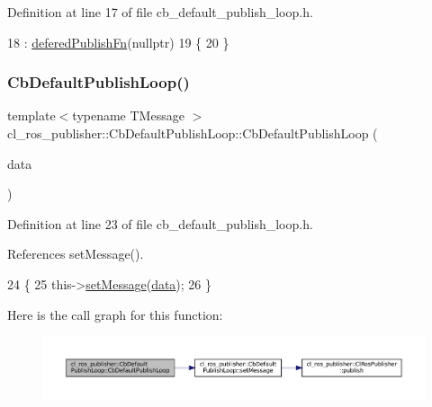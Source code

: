 Definition at line 17 of file cb\+\_\+default\+\_\+publish\+\_\+loop.\+h.


\begin{DoxyCode}
18         : \hyperlink{classcl__ros__publisher_1_1CbDefaultPublishLoop_ac0044704637edbd8f79a69d5b06de9ba}{deferedPublishFn}(\textcolor{keyword}{nullptr})
19     \{
20     \}
\end{DoxyCode}
\mbox{\label{classcl__ros__publisher_1_1CbDefaultPublishLoop_a41c35ec9ece9d457aa31efccfe4666c6}} 
\subsubsection{\texorpdfstring{Cb\+Default\+Publish\+Loop()}{CbDefaultPublishLoop()}\hspace{0.1cm}{\footnotesize\ttfamily [2/2]}}
{\footnotesize\ttfamily template$<$typename T\+Message $>$ \\
cl\+\_\+ros\+\_\+publisher\+::\+Cb\+Default\+Publish\+Loop\+::\+Cb\+Default\+Publish\+Loop (\begin{DoxyParamCaption}\item[{const T\+Message \&}]{data }\end{DoxyParamCaption})\hspace{0.3cm}{\ttfamily [inline]}}



Definition at line 23 of file cb\+\_\+default\+\_\+publish\+\_\+loop.\+h.



References set\+Message().


\begin{DoxyCode}
24     \{
25         this->\hyperlink{classcl__ros__publisher_1_1CbDefaultPublishLoop_a0377d84fde4cd1193abe5daf172359a7}{setMessage}(\hyperlink{namespacekeyboard__server__node_abfec01745fb17e2aa813913bea03d707}{data});
26     \}
\end{DoxyCode}
Here is the call graph for this function\+:
\nopagebreak
\begin{figure}[H]
\begin{center}
\leavevmode
\includegraphics[width=350pt]{classcl__ros__publisher_1_1CbDefaultPublishLoop_a41c35ec9ece9d457aa31efccfe4666c6_cgraph}
\end{center}
\end{figure}


